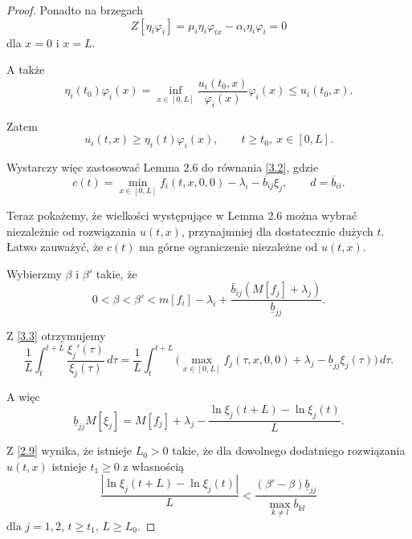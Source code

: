 \begin{proof}
		Ponadto na brzegach
		\begin{equation}
			Z[\eta_i \varphi_i] = \mu_i \eta_i \varphi_{ix} - \alpha_i \eta_i \varphi_i = 0
		\end{equation}
		dla $x=0$ i $x=L$.
		
		A także
		\begin{equation}
			\eta_i(t_0)\varphi_i(x)
			= \inf_{x\in[0,L]}\frac{u_i(t_0,x)}{\varphi_i(x)}\varphi_i(x)
			\le u_i(t_0,x).
		\end{equation}
		
		Zatem
		\begin{equation}
			u_i(t,x) \ge \eta_i(t)\varphi_i(x), \qquad t \ge t_0,\ x\in [0,L].
		\end{equation}
		
		Wystarczy więc zastosować Lemma 2.6 do równania \eqref{3.2}, gdzie
		\begin{equation}
		c(t)= \min_{x\in [0,L]} f_i(t,x,0,0) - \lambda_i - \overline{b}_{ij}\xi_j,
		\qquad 
		d=\overline{b}_{ii}.
		\end{equation}
		
		Teraz pokażemy, że wielkości występujące w Lemma 2.6 można wybrać niezależnie od rozwiązania $u(t,x)$, przynajmniej dla dostatecznie dużych $t$.
		Łatwo zauważyć, że $c(t)$ ma górne ograniczenie niezależne od $u(t,x)$.
		
		Wybierzmy $\beta$ i $\beta'$ takie, że
		\begin{equation}
			\label{3.3}
			0<\beta<\beta'< m[f_i] - \lambda_i + \frac{\bar{b}_{ij}(M[f_j]+\lambda_j)}{\underline{b}_{jj}}.
		\end{equation}
		
		Z \eqref{3.3} otrzymujemy
		\begin{equation}
		\frac{1}{L} \int_{t}^{t+L} \frac{\xi_j'(\tau)}{\xi_j(\tau)}\, d\tau
		= \frac{1}{L}\int_{t}^{t+L} \bigl(\max_{x\in[0,L]} f_j(\tau,x,0,0)
		+\lambda_j - \underline{b}_{jj}\xi_j(\tau)\bigr)\, d\tau.
		\end{equation}
		
		A więc
		\begin{equation}
			\label{3.4}
			\underline{b}_{jj} M[\xi_j]
			= M[f_j] + \lambda_j
			- \frac{\ln \xi_j(t+L) - \ln \xi_j(t)}{L}.
		\end{equation}
		
		Z \eqref{2.9} wynika, że istnieje $L_0>0$ takie, że dla dowolnego dodatniego rozwiązania $u(t,x)$ istnieje $t_1\ge 0$ z własnością
		\begin{equation}
		\frac{|\ln \xi_j(t+L) - \ln \xi_j(t)|}{L}
		< \frac{(\beta'-\beta)\underline{b}_{jj}}{\max_{k\neq l}\overline{b}_{kl}}
		\end{equation}
		dla $j=1,2$, $t\ge t_1$, $L \ge L_0$.
		

\end{proof}
